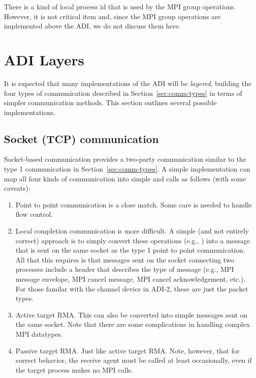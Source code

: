 There is a kind of local process id that is used by the MPI group
operations.  However, it is not critical item and, since the MPI group
operations are implemented above the ADI, we do not discuss them here.

\section{ADI Layers}
\label{sec:layers}

It is expected that many implementations of the ADI will be \emph{layered},
building the four types of communication described in
Section~\ref{sec:comm-types} in terms of simpler communication methods.
This section outlines several possible implementations.

\subsection{Socket (TCP) communication}
Socket-based communication provides a two-party communication similar
to the type 1 communication in Section~\ref{sec:comm-types}.  A simple
implementation can map all four kinds of communication into simple
 and  calls as follows (with some caveats):
\begin{enumerate}
\item Point to point communication is a close match.  Some care is
needed to handle flow control.

\item Local completion communication is more difficult.  A simple (and
not entirely correct) approach is to simply convert these operations
(e.g., ) into a message that is sent on the
same socket as the type 1 point to point communication.  All that this
requires is that messages sent on the socket connecting two processes
include a header that describes the type of message (e.g., MPI message
envelope, MPI cancel message, MPI cancel acknowledgement, etc.).  For
those familar with the channel device in ADI-2, these are just the
packet types.

\item Active target RMA.  This can also be converted into simple
messages sent on the same socket.  Note that there are some
complications in handling complex MPI datatypes.

\item Passive target RMA.  Just like active target RMA.  Note,
however, that for correct behavior, the receive agent must be called
at least occasionally, even if the target process makes no MPI calls.
\end{enumerate}


